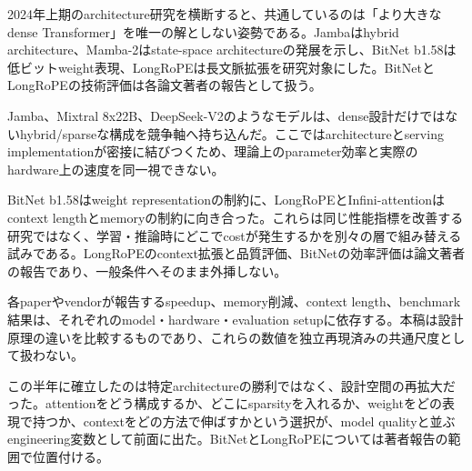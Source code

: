 
2024年上期のarchitecture研究を横断すると、共通しているのは「より大きなdense Transformer」を唯一の解としない姿勢である。Jambaはhybrid architecture、Mamba-2はstate-space architectureの発展を示し、BitNet b1.58は低ビットweight表現、LongRoPEは長文脈拡張を研究対象にした。BitNetとLongRoPEの技術評価は各論文著者の報告として扱う。\autocite{src-0cba3ed32188,src-b5fbfc0d43e4,src-e0e69bb00ff7,src-fb3cf48135e8}


Jamba、Mixtral 8x22B、DeepSeek-V2のようなモデルは、dense設計だけではないhybrid/sparseな構成を競争軸へ持ち込んだ。ここではarchitectureとserving implementationが密接に結びつくため、理論上のparameter効率と実際のhardware上の速度を同一視できない。\autocite{src-05f98c47f3e8,src-b5fbfc0d43e4,src-d9d69089eb6a}


BitNet b1.58はweight representationの制約に、LongRoPEとInfini-attentionはcontext lengthとmemoryの制約に向き合った。これらは同じ性能指標を改善する研究ではなく、学習・推論時にどこでcostが発生するかを別々の層で組み替える試みである。LongRoPEのcontext拡張と品質評価、BitNetの効率評価は論文著者の報告であり、一般条件へそのまま外挿しない。\autocite{src-2eb2353f0533,src-e0e69bb00ff7,src-fb3cf48135e8}


\begin{claimboundary}
各paperやvendorが報告するspeedup、memory削減、context length、benchmark結果は、それぞれのmodel・hardware・evaluation setupに依存する。本稿は設計原理の違いを比較するものであり、これらの数値を独立再現済みの共通尺度として扱わない。\autocite{src-0cba3ed32188,src-b5fbfc0d43e4,src-e0e69bb00ff7,src-fb3cf48135e8}
\end{claimboundary}

この半年に確立したのは特定architectureの勝利ではなく、設計空間の再拡大だった。attentionをどう構成するか、どこにsparsityを入れるか、weightをどの表現で持つか、contextをどの方法で伸ばすかという選択が、model qualityと並ぶengineering変数として前面に出た。BitNetとLongRoPEについては著者報告の範囲で位置付ける。\autocite{src-05f98c47f3e8,src-0cba3ed32188,src-b5fbfc0d43e4,src-d9d69089eb6a,src-e0e69bb00ff7,src-fb3cf48135e8}

